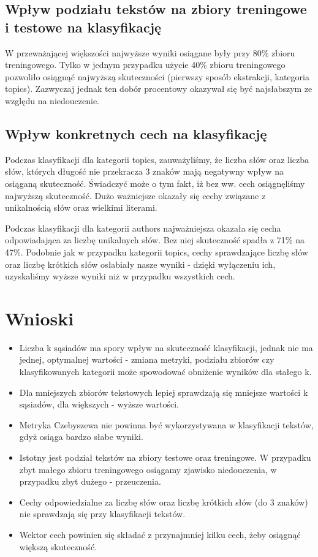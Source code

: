\documentclass{classrep}
\begin{document}
\subsection{Wpływ podziału tekstów na zbiory treningowe i testowe na klasyfikację}
W przeważającej większości najwyższe wyniki osiągane były przy 80\% zbioru treningowego. Tylko w jednym przypadku użycie 40\% zbioru treningowego pozwoliło osiągnąć najwyższą skuteczności (pierwszy sposób ekstrakcji, kategoria topics). Zazwyczaj jednak ten dobór procentowy okazywał się być najsłabszym ze względu na niedouczenie. 
\newline

\subsection{Wpływ konkretnych cech na klasyfikację}
Podczas klasyfikacji dla kategorii topics, zauważyliśmy, że liczba słów oraz liczba słów, których długość nie przekracza 3 znaków mają negatywny wpływ na osiąganą skuteczność. Świadczyć może o tym fakt, iż bez ww. cech osiągnęliśmy najwyższą skuteczność. Dużo ważniejsze okazały się cechy związane z unikalnością słów oraz wielkimi literami. \newline

Podczas klasyfikacji dla kategorii authors najważniejsza okazała się cecha odpowiadająca za liczbę unikalnych słów. Bez niej skuteczność spadła z 71\% na 47\%. Podobnie jak w przypadku kategorii topics, cechy sprawdzające liczbę słów oraz liczbę krótkich słów osłabiały nasze wyniki - dzięki wyłączeniu ich, uzyskaliśmy wyższe wyniki niż w przypadku wszystkich cech. 

	
\section{Wnioski}
\begin{itemize}
	\item Liczba k sąsiadów ma spory wpływ na skuteczność klasyfikacji, jednak nie ma jednej, optymalnej wartości - zmiana metryki, podziału zbiorów czy klasyfikowanych kategorii może spowodować obniżenie wyników dla stałego k.
	\item Dla mniejszych zbiorów tekstowych lepiej sprawdzają się mniejsze wartości k sąsiadów, dla większych - wyższe wartości.
	\item Metryka Czebyszewa nie powinna być wykorzystywana w klasyfikacji tekstów, gdyż osiąga bardzo słabe wyniki.
	\item Istotny jest podział tekstów na zbiory testowe oraz treningowe. W przypadku zbyt małego zbioru treningowego osiągamy zjawisko niedouczenia, w przypadku zbyt dużego - przeuczenia.
	\item Cechy odpowiedzialne za liczbę słów oraz liczbę krótkich słów (do 3 znaków)  nie sprawdzają się przy klasyfikacji tekstów.
	\item Wektor cech powinien się składać z przynajmniej kilku cech, żeby osiągnąć większą skuteczność.
\end{itemize}
\end{document}
